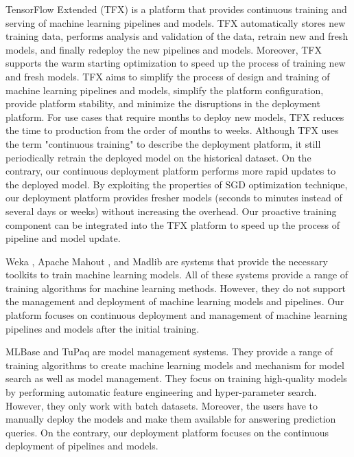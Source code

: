 TensorFlow Extended (TFX) is a platform that provides continuous training and serving of machine learning pipelines and models.
TFX automatically stores new training data, performs analysis and validation of the data, retrain new and fresh models, and finally redeploy the new pipelines and models. 
Moreover, TFX supports the warm starting optimization to speed up the process of training new and fresh models.
TFX aims to simplify the process of design and training of machine learning pipelines and models, simplify the platform configuration, provide platform stability, and minimize the disruptions in the deployment platform.
For use cases that require months to deploy new models, TFX reduces the time to production from the order of months to weeks.
Although TFX uses the term "continuous training" to describe the deployment platform, it still periodically retrain the deployed model on the historical dataset.
On the contrary, our continuous deployment platform performs more rapid updates to the deployed model.
By exploiting the properties of SGD optimization technique, our deployment platform provides fresher models (seconds to minutes instead of several days or weeks) without increasing the overhead.
Our proactive training component can be integrated into the TFX platform to speed up the process of pipeline and model update.

Weka \cite{hall2009weka}, Apache Mahout \cite{Owen:2011:MA:2132656}, and Madlib \cite{hellerstein2012madlib} are systems that provide the necessary toolkits to train machine learning models. 
All of these systems provide a range of training algorithms for machine learning methods. 
However, they do not support the management and deployment of machine learning models and pipelines. 
Our platform focuses on continuous deployment and management of machine learning pipelines and models after the initial training.

MLBase \cite{kraska2013mlbase} and TuPaq \cite{sparks2015tupaq} are model management systems.
They provide a range of training algorithms to create machine learning models and mechanism for model search as well as model management.
They focus on training high-quality models by performing automatic feature engineering and hyper-parameter search.
However, they only work with batch datasets.
Moreover, the users have to manually deploy the models and make them available for answering prediction queries.
On the contrary, our deployment platform focuses on the continuous deployment of pipelines and models.
